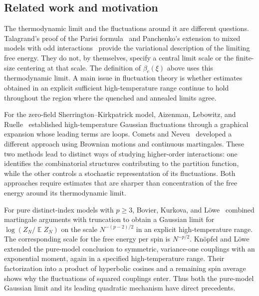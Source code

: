 \documentclass[letterpaper,11pt,reqno]{amsart}
\renewcommand{\geq}{\geqslant}
\DeclareMathOperator{\E}{\mathds{E}}
\begin{document}
\subsection{Related work and motivation}
\label{subsec:related-work}

The thermodynamic limit and the fluctuations around it are different
questions. Talagrand's proof of the Parisi formula~\cite{Talagrand2006}
and Panchenko's extension to mixed models with odd
interactions~\cite{Panchenko2014} provide the variational description of
the limiting free energy. They do not, by themselves, specify a central
limit scale or the finite-size centering at that scale. The definition
of $\beta_c(\xi)$ above uses this thermodynamic limit. A main issue in
fluctuation theory is whether estimates obtained in an explicit
sufficient high-temperature range continue to hold throughout the
region where the quenched and annealed limits agree.

For the zero-field Sherrington--Kirkpatrick model, Aizenman, Lebowitz,
and Ruelle~\cite{ALR1987} established high-temperature Gaussian
fluctuations through a graphical expansion whose leading terms are
loops. Comets and Neveu~\cite{CometsNeveu1995} developed a different
approach using Brownian motions and continuous martingales. These two
methods lead to distinct ways of studying higher-order interactions:
one identifies the combinatorial structures contributing to the
partition function, while the other controls a stochastic
representation of its fluctuations. Both approaches require estimates
that are sharper than concentration of the free energy around its
thermodynamic limit.

For pure distinct-index models with $p\geq3$, Bovier, Kurkova, and
L\"owe~\cite{BovierKurkovaLowe2002} combined martingale arguments with
truncation to obtain a Gaussian limit for
$\log(Z_N/\E Z_N)$ on the scale $N^{-(p-2)/2}$ in an explicit
high-temperature range. The corresponding scale for the free energy
per spin is $N^{-p/2}$. Kn\"opfel and L\"owe~\cite{KnopfelLowe2005}
extended the pure-model conclusion to symmetric, variance-one
couplings with an exponential moment, again in a specified
high-temperature range. Their factorization into a product of
hyperbolic cosines and a remaining spin average shows why the
fluctuations of squared couplings enter. Thus both the pure-model
Gaussian limit and its leading quadratic mechanism have direct
precedents.
\end{document}
